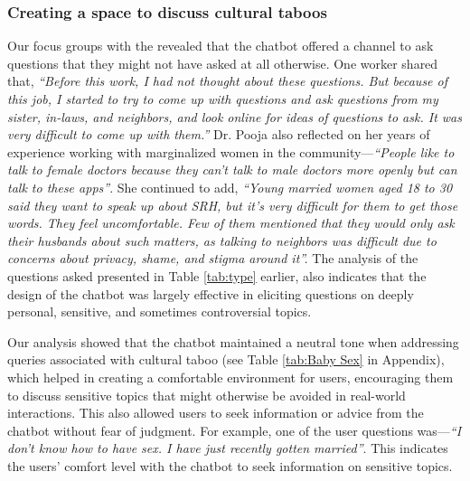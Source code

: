 \subsubsection{Creating a space to discuss cultural taboos}
Our focus groups with the  revealed that the chatbot offered a channel to ask questions that they might not have asked at all otherwise. One worker shared that, \textit{``Before this work, I had not thought about these questions. But because of this job, I started to try to come up with questions and ask questions from my sister, in-laws, and neighbors, and look online for ideas of questions to ask. It was very difficult to come up with them.''}
Dr. Pooja also reflected on her years of experience working with marginalized women in the community---\textit{``People like to talk to female doctors because they can't talk to male doctors more openly but can talk to these apps''}. She continued to add, \textit{``Young married women aged 18 to 30 said they want to speak up about SRH, but it's very difficult for them to get those words. They feel uncomfortable. Few of them mentioned that they would only ask their husbands about such matters, as talking to neighbors was difficult due to concerns about privacy, shame, and stigma around it''.} The analysis of the questions asked presented in Table \ref{tab:type} earlier, also indicates that the design of the chatbot was largely effective in eliciting questions on deeply personal, sensitive, and sometimes controversial topics.

Our analysis showed that the chatbot maintained a neutral tone when addressing queries associated with cultural taboo (see Table \ref{tab:Baby Sex} in Appendix), which helped in creating a comfortable environment for users, encouraging them to discuss sensitive topics that might otherwise be avoided in real-world interactions. This also allowed users to seek information or advice from the chatbot without fear of judgment. For example, one of the user questions was---\textit{``I don’t know how to have sex. I have just recently gotten married''}. This indicates the users' comfort level with the chatbot to seek information on sensitive topics. 

